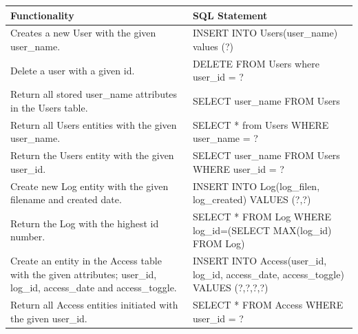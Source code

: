 \documentclass[a4paper]{article}
\begin{document}
\begin{table}[H]
    \centering
    \begin{tabular}{|p{5cm}|p{8cm}|}
    \hline
    \textbf{Functionality}                                                                                                                   & \textbf{SQL Statement}                                                                                                                                          \\ \hline
    Creates a new User with the given user\_name.                                                                   & INSERT INTO Users(user\_name) values (?)                                         \\ \hline
    Delete a user with a given id.                                                                                  & DELETE FROM Users where user\_id = ?                                             \\ \hline
    Return all stored user\_name attributes in the Users table.                                                     & SELECT user\_name FROM Users                                                     \\ \hline
    Return all Users entities with the given user\_name.                                                            & SELECT * from Users WHERE user\_name = ?                                         \\ \hline
    Return the Users entity with the given user\_id.                                                                & SELECT user\_name FROM Users WHERE user\_id = ?                                  \\ \hline
    Create new Log entity with the given filename and created date.                                                 & INSERT INTO Log(log\_filen, log\_created) VALUES (?,?)                           \\ \hline
    Return the Log with the highest id number.                                                                      & SELECT * FROM Log WHERE log\_id=(SELECT MAX(log\_id) FROM Log)                   \\ \hline
    Create an entity in the Access table with the given attributes; user\_id, log\_id, access\_date and access\_toggle. & INSERT INTO Access(user\_id, log\_id, access\_date, access\_toggle) VALUES (?,?,?,?) \\ \hline
    Return all Access entities initiated with the given user\_id.                                                   & SELECT * FROM Access WHERE user\_id = ?                                          \\ \hline
    \end{tabular}
\end{table}
\end{document}
